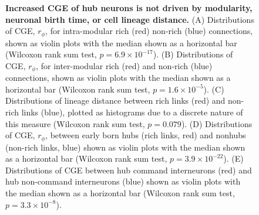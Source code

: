 \documentclass[10pt,letterpaper]{article}
\begin{document}
{%
\begin{figure}[!h]
\centering
 \caption{
 \textbf{Increased CGE of hub neurons is not driven by modularity, neuronal birth time, or cell lineage distance.}
(A) Distributions of CGE, $r_\phi$, for intra-modular rich (red) non-rich (blue) connections, shown as violin plots with the median shown as a horizontal bar (Wilcoxon rank sum test, $p = 6.9 \times 10^{-17}$).
(B) Distributions of CGE, $r_\phi$, for inter-modular rich (red) and non-rich (blue) connections, shown as violin plots with the median shown as a horizontal bar (Wilcoxon rank sum test, $p = 1.6 \times 10^{-5}$).
(C) Distributions of lineage distance between rich links (red) and non-rich links (blue), plotted as histograms due to a discrete nature of this measure (Wilcoxon rank sum test, $p = 0.079$).
(D) Distributions of CGE, $r_\phi$, between early born hubs (rich links, red) and nonhubs (non-rich links, blue) shown as violin plots with the median shown as a horizontal bar (Wilcoxon rank sum test, $p = 3.9 \times 10^{-22}$).
(E) Distributions of CGE between hub command interneurons (red) and hub non-command interneurons (blue) shown as violin plots with the median shown as a horizontal bar (Wilcoxon rank sum test, $p = 3.3 \times 10^{-8}$).
}
\end{figure}}
\end{document}
